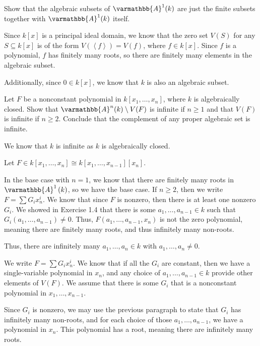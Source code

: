 \documentclass[10pt]{mypackage}
\renewcommand*{\mathbb}[1]{\varmathbb{#1}}
\newcommand{\A}{\mathbb{A}}
\begin{document}
\begin{exercise}[Exercise 1.8]
  Show that the algebraic subsets of $\A^1(k)$ are just the finite subsets together with $\A^1(k)$ itself.
\end{exercise}
\begin{solution}
  Since $k\left[x\right]$ is a principal ideal domain, we know that the zero set $V(S)$ for any $S\subseteq k\left[x\right]$ is of the form $V\left(\left\langle f \right\rangle\right) = V\left(f\right)$, where $f\in k\left[x\right]$. Since $f$ is a polynomial, $f$ has finitely many roots, so there are finitely many elements in the algebraic subset.\newline

  Additionally, since $0\in k\left[x\right]$, we know that $k$ is also an algebraic subset.
\end{solution}
\begin{exercise}[Exercise 1.14]
Let $F$ be a nonconstant polynomial in $k\left[x_1,\dots,x_n\right]$, where $k$ is algebraically closed. Show that $\A^n(k)\setminus V(F)$ is infinite if $n\geq 1$ and that $V(F)$ is infinite if $n\geq 2$. Conclude that the complement of any proper algebraic set is infinite.
\end{exercise}
\begin{solution}
  We know that $k$ is infinite as $k$ is algebraically closed.\newline

  Let $F\in k\left[x_1,\dots,x_n\right] \cong k\left[x_1,\dots,x_{n-1}\right]\left[x_n\right]$.\newline

  In the base case with $n=1$, we know that there are finitely many roots in $\A^1\left(k\right)$, so we have the base case. If $n\geq 2$, then we write $F = \sum G_ix_n^{i}$. We know that since $F$ is nonzero, then there is at least one nonzero $G_i$. We showed in Exercise 1.4 that there is some $a_1,\dots,a_{n-1}\in k$ such that $G_i\left(a_1,\dots,a_{n-1}\right)\neq 0$. Thus, $F\left(a_{1},\dots,a_{n-1},x_n\right)$ is not the zero polynomial, meaning there are finitely many roots, and thus infinitely many non-roots.\newline

  Thus, there are infinitely many $a_1,\dots,a_n\in k $ with $a_1,\dots,a_n\neq 0$.\newline

  We write $F = \sum G_ix_n^{i}$. We know that if all the $G_i$ are constant, then we have a single-variable polynomial in $x_n$, and any choice of $a_1,\dots,a_{n-1}\in k$ provide other elements of $V(F)$. We assume that there is some $G_i$ that is a nonconstant polynomial in $x_1,\dots,x_{n-1}$.\newline

  Since $G_i$ is nonzero, we may use the previous paragraph to state that $G_i$ has infinitely many non-roots, and for each choice of those $a_1,\dots,a_{n-1}$, we have a polynomial in $x_n$. This polynomial has a root, meaning there are infinitely many roots.
\end{solution}
\end{document}
